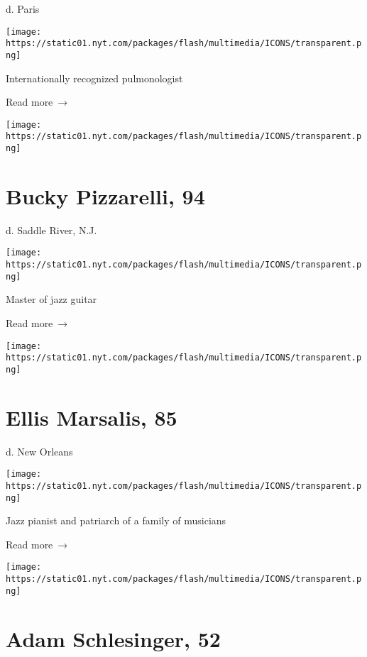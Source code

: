 d. Paris

\texttt{[image: https://static01.nyt.com/packages/flash/multimedia/ICONS/transparent.png]}

Internationally recognized pulmonologist

 Read more~→

\href{https://www.nytimes.com/2020/04/02/arts/music/bucky-pizzarelli-dead-coronavirus.html}{}

\texttt{[image: https://static01.nyt.com/packages/flash/multimedia/ICONS/transparent.png]}

\hypertarget{bucky-pizzarelli-94}{%
\section{Bucky Pizzarelli, 94}\label{bucky-pizzarelli-94}}

d. Saddle River, N.J.

\texttt{[image: https://static01.nyt.com/packages/flash/multimedia/ICONS/transparent.png]}

Master of jazz guitar

 Read more~→

\href{https://www.nytimes.com/2020/04/01/arts/music/ellis-marsalis-dead-virus.html}{}

\texttt{[image: https://static01.nyt.com/packages/flash/multimedia/ICONS/transparent.png]}

\hypertarget{ellis-marsalis-85}{%
\section{Ellis Marsalis, 85}\label{ellis-marsalis-85}}

d. New Orleans

\texttt{[image: https://static01.nyt.com/packages/flash/multimedia/ICONS/transparent.png]}

Jazz pianist and patriarch of a family of musicians

 Read more~→

\href{https://www.nytimes.com/2020/04/01/arts/music/adam-schlesinger-dead-coronavirus.html}{}

\texttt{[image: https://static01.nyt.com/packages/flash/multimedia/ICONS/transparent.png]}

\hypertarget{adam-schlesinger-52}{%
\section{Adam Schlesinger, 52}\label{adam-schlesinger-52}}

